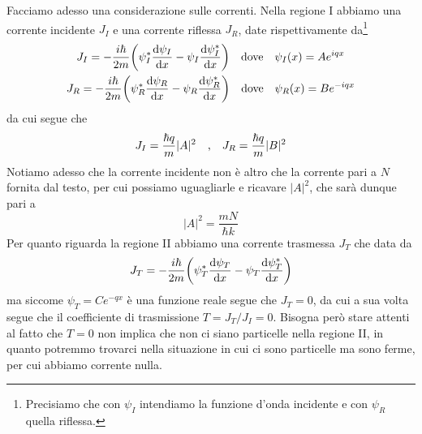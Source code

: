 \begin{soluzione}
\begin{equation*}
   \end{equation*}
   Facciamo adesso una considerazione sulle correnti. Nella regione I abbiamo una corrente incidente $J_I$ e una corrente riflessa $J_R$, date rispettivamente da\footnote{Precisiamo che con $\psi_I$ intendiamo la funzione d'onda incidente e con $\psi_R$ quella riflessa.}
   \begin{gather*}
      J_I=-\frac{i\hbar}{2m} \qty( \psi_I^*\dv{\psi_I}{x} - \psi_I\dv{\psi_I^*}{x} )
      \qq{dove}
      \psi_I(x)=Ae^{iqx}
      \\
      J_R=-\frac{i\hbar}{2m} \qty( \psi_R^*\dv{\psi_R}{x} - \psi_R\dv{\psi_R^*}{x} )
      \qq{dove}
      \psi_R(x)=Be^{-iqx}
   \end{gather*}
   da cui segue che
   \begin{equation*}
      J_I=\frac{\hbar q}{m}|A|^2
      \qq{,}
      J_R=\frac{\hbar q}{m}|B|^2
   \end{equation*}
   Notiamo adesso che la corrente incidente non è altro che la corrente pari a $N$ fornita dal testo, per cui possiamo uguagliarle e ricavare $|A|^2$, che sarà dunque pari a
   \begin{equation*}
      |A|^2=\frac{mN}{\hbar k}
   \end{equation*}
   Per quanto riguarda la regione II abbiamo una corrente trasmessa $J_T$ che data da
   \begin{equation*}
      J_T=-\frac{i\hbar}{2m} \qty( \psi_T^*\dv{\psi_T}{x} - \psi_T\dv{\psi_T^*}{x} )
   \end{equation*}
   ma siccome $\psi_T=Ce^{-qx}$ è una funzione reale segue che $J_T=0$, da cui a sua volta segue che il coefficiente di trasmissione $T=J_T/J_I=0$. Bisogna però stare attenti al fatto che $T=0$ non implica che non ci siano particelle nella regione II, in quanto potremmo trovarci nella situazione in cui ci sono particelle ma sono ferme, per cui abbiamo corrente nulla.
   

\end{soluzione}
